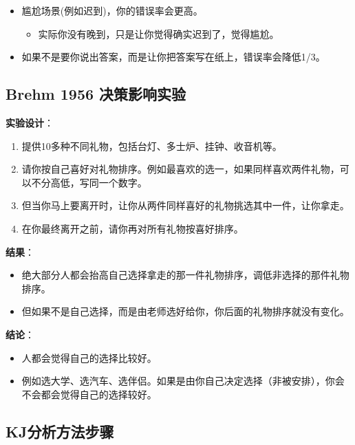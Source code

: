 \begin{itemize}
\tightlist
\item
  尴尬场景(例如迟到)，你的错误率会更高。

  \begin{itemize}
  \tightlist
  \item
    实际你没有晚到，只是让你觉得确实迟到了，觉得尴尬。
  \end{itemize}
\item
  如果不是要你说出答案，而是让你把答案写在纸上，错误率会降低1/3。
\end{itemize}

\hypertarget{brehm-1956-ux51b3ux7b56ux5f71ux54cdux5b9eux9a8c}{%
\subsection{Brehm 1956
决策影响实验}\label{brehm-1956-ux51b3ux7b56ux5f71ux54cdux5b9eux9a8c}}

\textbf{实验设计}：

\begin{enumerate}
\tightlist
\item
  提供10多种不同礼物，包括台灯、多士炉、挂钟、收音机等。
\item
  请你按自己喜好对礼物排序。例如最喜欢的选一，如果同样喜欢两件礼物，可以不分高低，写同一个数字。
\item
  但当你马上要离开时，让你从两件同样喜好的礼物挑选其中一件，让你拿走。
\item
  在你最终离开之前，请你再对所有礼物按喜好排序。
\end{enumerate}

\textbf{结果}：

\begin{itemize}
\tightlist
\item
  绝大部分人都会抬高自己选择拿走的那一件礼物排序，调低非选择的那件礼物排序。
\item
  但如果不是自己选择，而是由老师选好给你，你后面的礼物排序就没有变化。
\end{itemize}

\textbf{结论}：

\begin{itemize}
\tightlist
\item
  人都会觉得自己的选择比较好。
\item
  例如选大学、选汽车、选伴侣。如果是由你自己决定选择（非被安排），你会不会都会觉得自己的选择较好。
\end{itemize}

\hypertarget{kjux5206ux6790ux65b9ux6cd5ux6b65ux9aa4}{%
\subsection{KJ分析方法步骤}\label{kjux5206ux6790ux65b9ux6cd5ux6b65ux9aa4}}

